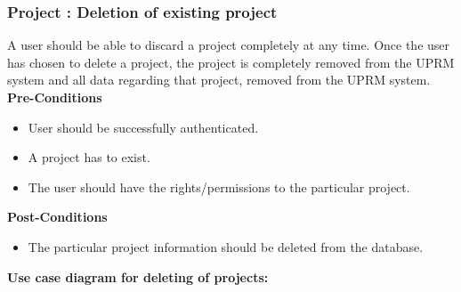 \subsubsection{Project : Deletion of existing project}
A user should be able to discard a project completely at any time. Once the user has chosen to delete a project, the project is completely removed from the UPRM system and all data regarding that project, removed from the UPRM system.\\
\textbf{Pre-Conditions}
\begin{itemize}
	\item User should be successfully authenticated.
	\item A project has to exist.
	\item The user should have the rights/permissions to the particular project.
\end{itemize}
\textbf{Post-Conditions}
\begin{itemize}
	\item The particular project information should be deleted from the database.
\end{itemize}
\textbf{Use case diagram for deleting of projects: }\\
\centerline{}